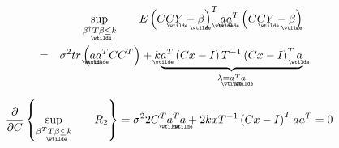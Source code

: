 \documentclass{article}
\begin{document}
\begin{eqnarray}
&&\underset{\beta ^{\dagger }T%
\underaccent{\wtilde}{\beta}%
\leq k}{\sup }\qquad E\left( CC%
\underaccent{\wtilde}{Y}%
-%
\underaccent{\wtilde}{\beta}%
\right) ^{T}%
\underaccent{\wtilde}{a}%
\underaccent{\wtilde}{a}%
^{T}\left( CC%
\underaccent{\wtilde}{Y}%
-%
\underaccent{\wtilde}{\beta}%
\right)   \notag \\
&=&\sigma ^{2}tr\left( 
\underaccent{\wtilde}{a}%
\underaccent{\wtilde}{a}%
^{T}CC^{T}\right) +k\underset{\lambda =%
\underaccent{\wtilde}{a}%
^{T}%
\underaccent{\wtilde}{a}%
}{\underbrace{%
\underaccent{\wtilde}{a}%
^{T}\left( Cx-I\right) T^{-1}\left( Cx-I\right) ^{T}%
\underaccent{\wtilde}{a}%
}}
\end{eqnarray}

\begin{equation*}
\frac{\partial }{\partial C}\left\{ \underset{\beta ^{T}T%
\underaccent{\wtilde}{\beta}%
\leq k}{\sup }\qquad R_{2}\right\} =\sigma ^{2}2C^{T}%
\underaccent{\wtilde}{a}%
^{T}%
\underaccent{\wtilde}{a}%
+2kxT^{-1}\left( Cx-I\right) ^{T}aa^{T}=0
\end{equation*}
\end{document}

